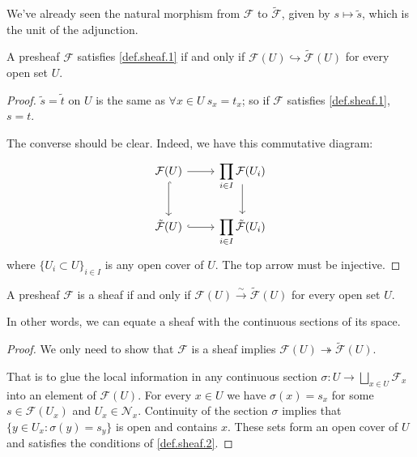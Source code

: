 We've already seen the natural morphism from $\mathcal{F}$ to $\tilde{\mathcal{F}}$, given by $s\mapsto\tilde{s}$, which is the unit of the adjunction. 

\begin{theorem}\label{thm.shff.inj}
    A presheaf $\mathcal{F}$ satisfies \ref{def.sheaf.1} if and only if $\mathcal{F}(U)\hookrightarrow\tilde{\mathcal{F}}(U)$ for every open set $U$.
\end{theorem}

\begin{proof}
    $\tilde{s}=\tilde{t}$ on $U$ is the same as $\forall x\in U\ s_x=t_x$; so if $\mathcal{F}$ satisfies \ref{def.sheaf.1}, $s=t$.
    
    The converse should be clear. Indeed, we have this commutative diagram:
    \[ \begin{tikzcd}
        \mathcal{F}(U) \arrow[r] \arrow[d, hook] & \displaystyle\prod_{i\in I}\mathcal{F}(U_i) \arrow[d, start anchor={[yshift=2ex]}] \\
        \tilde{\mathcal{F}}(U) \arrow[r, hook] & \displaystyle\prod_{i\in I}\tilde{\mathcal{F}}(U_i)
    \end{tikzcd} \]
    \noindent where $\{U_i\subset U\}_{i\in I}$ is any open cover of $U$.
    The top arrow must be injective.
\end{proof}

\begin{theorem}\label{thm.shff.iso}
    A presheaf $\mathcal{F}$ is a sheaf if and only if $\mathcal{F}(U)\xrightarrow{\sim}\tilde{\mathcal{F}}(U)$ for every open set $U$.

    In other words, we can equate a sheaf with the continuous sections of its \etale space.
\end{theorem}

\begin{proof}
    We only need to show that $\mathcal{F}$ is a sheaf implies $\mathcal{F}(U)\twoheadrightarrow\tilde{\mathcal{F}}(U)$.

    That is to glue the local information in any continuous section $\sigma:U\to\bigsqcup_{x\in U}\mathcal{F}_x$ into an element of $\mathcal{F}(U)$. For every $x\in U$ we have $\sigma(x)=s_x$ for some $s\in\mathcal{F}(U_x)$ and $U_x\in\mathcal{N}_x$. Continuity of the section $\sigma$ implies that $\{y\in U_x:\sigma(y)=s_y\}$ is open and contains $x$. These sets form an open cover of $U$ and satisfies the conditions of \ref{def.sheaf.2}.
\end{proof}

